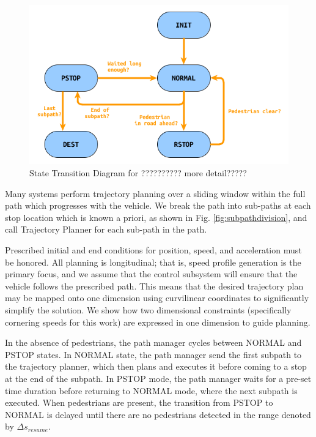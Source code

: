 \documentclass[letterpaper, 10 pt, conference]{ieeeconf}  %
\begin{document}
\begin{figure}[thpb]
  \centering
  \includegraphics[width=1.0\columnwidth]{graphics/StateMachineSimple.png}
  \caption{State Transition Diagram for ?????????? more detail????? }
  \label{fig:st}
\end{figure}

Many systems perform trajectory planning over a sliding window within the full path which progresses with the vehicle.
We break the path into sub-paths at each stop location which is known a priori, as shown in Fig. \ref{fig:subpathdivision}, and call Trajectory Planner for each sub-path in the path.

Prescribed initial and end conditions for position, speed, and acceleration must be honored.
All planning is longitudinal; that is, speed profile generation is the primary focus, and we assume that the control subsystem will ensure that the vehicle follows the prescribed path.
This means that the desired trajectory plan may be mapped onto one dimension using curvilinear coordinates to significantly simplify the solution.
We show how two dimensional constraints (specifically cornering speeds for this work) are expressed in one dimension to guide planning.

In the absence of pedestrians, the path manager cycles between NORMAL and PSTOP states.
In NORMAL state, the path manager send the first subpath to the trajectory planner, which then plans and executes it before coming to a stop at the end of the subpath.
In PSTOP mode, the path manager waits for a pre-set time duration before returning to NORMAL mode, where the next subpath is executed.
When pedestrians are present, the transition from PSTOP to NORMAL is delayed until there are no pedestrians detected in the range denoted by $\Delta s_{resume}$.
\end{document}

